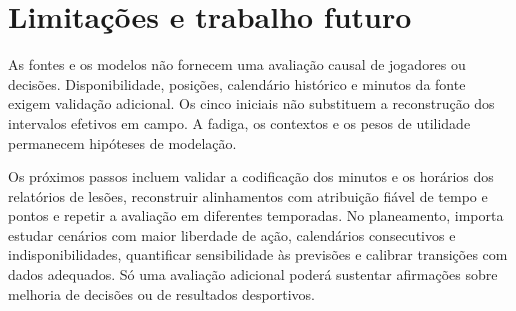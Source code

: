 \section{Limitações e trabalho futuro}

As fontes e os modelos não fornecem uma avaliação causal de jogadores ou
decisões. Disponibilidade, posições, calendário histórico e minutos da
fonte exigem validação adicional. Os cinco iniciais não substituem a
reconstrução dos intervalos efetivos em campo. A fadiga, os contextos e
os pesos de utilidade permanecem hipóteses de modelação.

Os próximos passos incluem validar a codificação dos minutos e os horários
dos relatórios de lesões, reconstruir alinhamentos com atribuição fiável
de tempo e pontos e repetir a avaliação em diferentes temporadas.
No planeamento, importa estudar cenários com maior liberdade de ação,
calendários consecutivos e indisponibilidades, quantificar sensibilidade
às previsões e calibrar transições com dados adequados. Só uma avaliação
adicional poderá sustentar afirmações sobre melhoria de decisões ou de
resultados desportivos.
